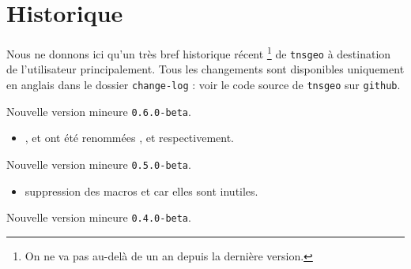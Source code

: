 \documentclass[12pt,a4paper]{article}
\begin{document}
\newpage

\section{Historique}

Nous ne donnons ici qu'un très bref historique récent
\footnote{
	On ne va pas au-delà de un an depuis la dernière version.
}
de \verb+tnsgeo+ à destination de l'utilisateur principalement.
Tous les changements sont disponibles uniquement en anglais dans le dossier \verb+change-log+ : voir le code source de \verb+tnsgeo+ sur \verb+github+.

\begin{description}

    \medskip
    \item[2021-03-03] Nouvelle version mineure \verb+0.6.0-beta+.
    
    \begin{itemize}[itemsep=.5em]
        \item {}
              ,
              et
              ont été renommées
              ,
              et
              respectivement.
    
    
    \end{itemize}
    
    \separation
    


    \medskip
    \item[2021-02-26] Nouvelle version mineure \verb+0.5.0-beta+.
    
    \begin{itemize}[itemsep=.5em]
        \item {}
              suppression des macros  et  car elles sont inutiles.
    
    
    \end{itemize}
    
    \separation
    


    \medskip
    \item[2020-09-02] Nouvelle version mineure \verb+0.4.0-beta+.
    

\end{description}
\end{document}
